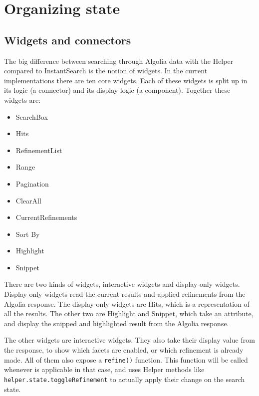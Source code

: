 
\section{Organizing state} %
\label{sec:organizing_state}

\subsection{Widgets and connectors}
\label{sub:widgets_and_connectors}

The big difference between searching through Algolia data with the Helper compared to InstantSearch is the notion of widgets. In the current implementations there are ten core widgets. Each of these widgets is split up in its logic (a connector) and its display logic (a component). Together these widgets are:

\begin{itemize}
  \item SearchBox
  \item Hits
  \item RefinementList
  \item Range
  \item Pagination
  \item ClearAll
  \item CurrentRefinements
  \item Sort By
  \item Highlight
  \item Snippet
\end{itemize}

There are two kinds of widgets, interactive widgets and display-only widgets. Display-only widgets read the current results and applied \glspl{refinement} from the Algolia response. The display-only widgets are Hits, which is a representation of all the results. The other two are Highlight and Snippet, which take an attribute, and display the snipped and highlighted result from the Algolia response.

The other widgets are interactive widgets. They also take their display value from the response, to show which facets are enabled, or which \gls{refinement} is already made. All of them also expose a {\tt refine()} function. This function will be called whenever is applicable in that case, and uses Helper methods like {\tt helper.state.toggleRefinement} to actually apply their change on the search state.


